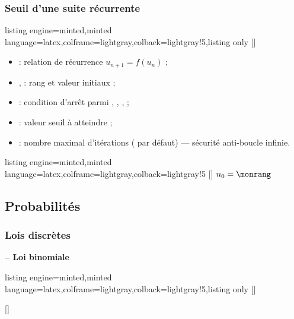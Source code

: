 \documentclass[11pt,a4paper]{ltxdoc}
\begin{document}
\subsubsection{Seuil d'une suite récurrente}

\begin{tcblisting}{listing engine=minted,minted language=latex,colframe=lightgray,colback=lightgray!5,listing only}
[\macro]
\end{tcblisting}

\begin{itemize}
  \item {} : relation de récurrence $u_{n+1} = f(u_n)$ ;
  \item {},  : rang et valeur initiaux ;
  \item {} : condition d'arrêt parmi \MontreCode{>}, \MontreCode{<}, \MontreCode{>=}, \MontreCode{<=} ;
  \item {} : valeur seuil à atteindre ;
  \item \MontreCode{[Nmax]} : nombre maximal d'itérations ( par défaut) — sécurité anti-boucle infinie.
\end{itemize}

\begin{tcblisting}{listing engine=minted,minted language=latex,colframe=lightgray,colback=lightgray!5}
[\monrang]
$n_0 = \monrang$
\end{tcblisting}

\subsection{Probabilités}

\subsubsection{Lois discrètes}

\textbf{-- Loi binomiale}

\begin{tcblisting}{listing engine=minted,minted language=latex,colframe=lightgray,colback=lightgray!5,listing only}
[\macro]

[\macro]
\end{tcblisting}
\end{document}

